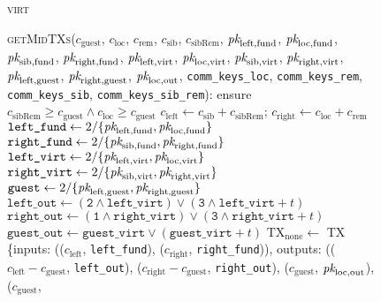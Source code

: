 \begin{figure}[H]
  \begin{processbox}{\textsc{virt}}
    \begin{algorithmic}[1]
      \State \textsc{getMidTXs}($c_{\mathrm{guest}}$, $c_{\mathrm{loc}}$,
      $c_{\mathrm{rem}}$, $c_{\mathrm{sib}}$, $c_{\mathrm{sibRem}}$,
      $\textit{pk}_{\mathrm{left}, \mathrm{fund}}$, $\textit{pk}_{\mathrm{loc}, \mathrm{fund}}$,
      $\textit{pk}_{\mathrm{sib}, \mathrm{fund}}$, $\textit{pk}_{\mathrm{right}, \mathrm{fund}}$,
      $\textit{pk}_{\mathrm{left}, \mathrm{virt}}$, $\textit{pk}_{\mathrm{loc}, \mathrm{virt}}$,
      $\textit{pk}_{\mathrm{sib}, \mathrm{virt}}$, $\textit{pk}_{\mathrm{right}, \mathrm{virt}}$,
      $\textit{pk}_{\mathrm{left}, \mathrm{guest}}$, $\textit{pk}_{\mathrm{right},
      \mathrm{guest}}$, $\textit{pk}_{\mathrm{loc}, \mathrm{out}}$,
      \texttt{comm\_keys\_loc}, \texttt{comm\_keys\_rem},
      \texttt{comm\_keys\_sib}, \texttt{comm\_keys\_sib\_rem}):
      \Indent
        \State ensure $c_{\mathrm{sibRem}} \geq c_{\mathrm{guest}} \wedge
        c_{\mathrm{loc}} \geq c_{\mathrm{guest}}$
        \State $c_{\mathrm{left}} \gets c_{\mathrm{sib}} + c_{\mathrm{sibRem}}$;
        $c_{\mathrm{right}} \gets c_{\mathrm{loc}} + c_{\mathrm{rem}}$
        \State $\texttt{left\_fund} \gets 2/\{\textit{pk}_{\mathrm{left}, \mathrm{fund}},
        \textit{pk}_{\mathrm{loc}, \mathrm{fund}}\}$
        \State $\texttt{right\_fund} \gets 2/\{\textit{pk}_{\mathrm{sib}, \mathrm{fund}},
        \textit{pk}_{\mathrm{right}, \mathrm{fund}}\}$
        \State $\texttt{left\_virt} \gets 2/\{\textit{pk}_{\mathrm{left}, \mathrm{virt}},
        \textit{pk}_{\mathrm{loc}, \mathrm{virt}}\}$
        \State $\texttt{right\_virt} \gets 2/\{\textit{pk}_{\mathrm{sib}, \mathrm{virt}},
        \textit{pk}_{\mathrm{right}, \mathrm{virt}}\}$
        \State $\texttt{guest} \gets 2/\{\textit{pk}_{\mathrm{left}, \mathrm{guest}},
        \textit{pk}_{\mathrm{right}, \mathrm{guest}}\}$
        \State $\texttt{left\_out} \gets (\texttt{2} \wedge \texttt{left\_virt})
        \vee (\texttt{3} \wedge \texttt{left\_virt} + t)$
        \State $\texttt{right\_out} \gets (\texttt{1} \wedge
        \texttt{right\_virt}) \vee (\texttt{3} \wedge \texttt{right\_virt} + t)$
        \State $\texttt{guest\_out} \gets \texttt{guest\_virt} \vee
        (\texttt{guest\_virt} + t)$
        \State $\mathrm{TX}_{\mathrm{none}} \gets$ TX \{inputs:
        (($c_{\mathrm{left}}$, \texttt{left\_fund}), ($c_{\mathrm{right}}$,
        \texttt{right\_fund})), outputs: (($c_{\mathrm{left}} -
        c_{\mathrm{guest}}$, \texttt{left\_out}), ($c_{\mathrm{right}} -
        c_{\mathrm{guest}}$, \texttt{right\_out}), ($c_{\mathrm{guest}}$,
        $\textit{pk}_{\mathrm{loc}, \mathrm{out}}$), ($c_{\mathrm{guest}}$,

\end{algorithmic}
\end{processbox}
\end{figure}
